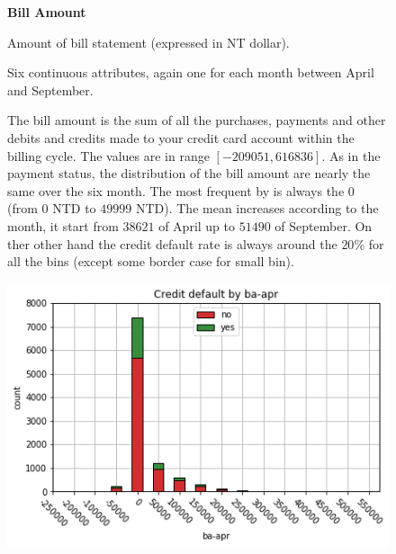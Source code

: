 \smallskip
\begin{figure}[h]
  \begin{minipage}[h]{.55\textwidth}
        {\Large \textbf{Bill Amount}}
        
        Amount of bill statement (expressed in NT dollar).
        
        Six continuous attributes, again one for each month between April and September.
        
        The bill amount is the sum of all the purchases, payments and other debits and credits made to your credit card account within the billing cycle. The values are in range $[-209051, 616836]$.
        As in the payment status, the distribution of the bill amount are nearly the same over the six month. The most frequent by is always the 0 (from $0$ NTD to $49999$ NTD).
        The mean increases according to the month, it start from $38621$ of April up to $51490$ of September. On ther other hand the credit default rate is always around the $20\%$ for all the bins (except some border case for small bin).
        
  \end{minipage}
  \begin{minipage}[h]{.45\textwidth}
    \includegraphics[width=.95\textwidth]{img/ch2/bill_amount_1}
  \end{minipage}
\end{figure}

